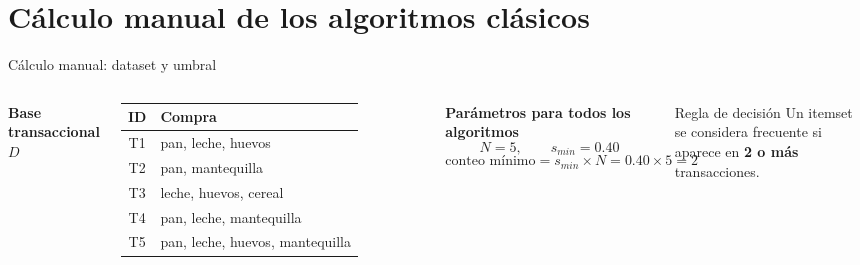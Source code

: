 \documentclass[10pt,aspectratio=169]{beamer}
\begin{document}
\section{Cálculo manual de los algoritmos clásicos}

\begin{frame}{Cálculo manual: dataset y umbral}
\scriptsize
\begin{columns}[T]
\textbf{Base transaccional $D$}
\begin{table}
\centering
\begin{tabular}{cl}
\toprule
ID & Compra \\
\midrule
T1 & pan, leche, huevos \\
T2 & pan, mantequilla \\
T3 & leche, huevos, cereal \\
T4 & pan, leche, mantequilla \\
T5 & pan, leche, huevos, mantequilla \\
\bottomrule
\end{tabular}
\end{table}

\textbf{Parámetros para todos los algoritmos}
\[
N=5, \qquad s_{min}=0.40
\]
\[
\text{conteo mínimo}=s_{min}\times N=0.40\times 5=2
\]
\begin{block}{Regla de decisión}
Un itemset se considera frecuente si aparece en \textbf{2 o más} transacciones.
\end{block}
\end{columns}
\end{frame}
\end{document}
